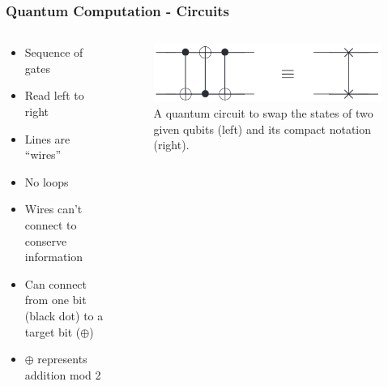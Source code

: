 \documentclass[aspectratio=169]{beamer}
\begin{document}
\begin{frame}
    \frametitle{Quantum Computation - Circuits}
    \begin{columns}
        \begin{column}{0.5\textwidth}
            \begin{itemize}
                \item Sequence of gates
                \item Read left to right
                \item Lines are ``wires''
                \item No loops
                \item Wires can't connect to conserve information
                \item Can connect from one bit (black dot) to a target bit ($\oplus$)
                \item $\oplus$ represents addition mod 2 
            \end{itemize}
        \end{column}
        \begin{column}{0.5\textwidth}
            \begin{figure}[h]
                \centering
                \includegraphics[width=\textwidth]{images/swap_circuit.png}
                \caption{A quantum circuit to swap the states of two given qubits (left) and its compact notation (right).}
            \end{figure}
        \end{column}
    \end{columns}
\end{frame}
\end{document}
